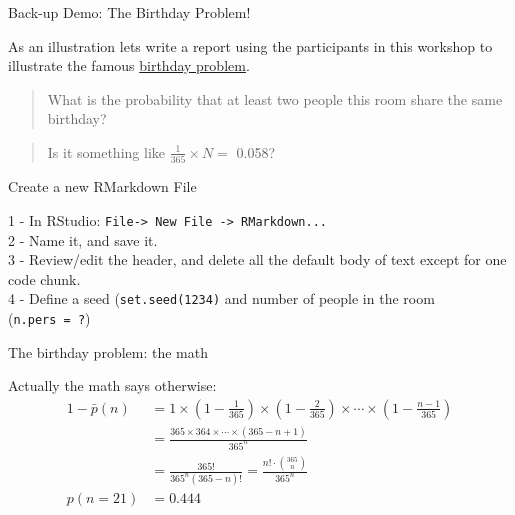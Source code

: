 \documentclass[ignorenonframetext,]{beamer}
\begin{document}
\begin{frame}{Back-up Demo: The Birthday Problem!}
\protect\hypertarget{back-up-demo-the-birthday-problem}{}

As an illustration lets write a report using the participants in this
workshop to illustrate the famous
\href{https://en.wikipedia.org/wiki/Birthday_problem}{birthday problem}.

\begin{quote}
What is the probability that at least two people this room share the
same birthday?
\end{quote}

\begin{quote}
Is it something like \(\frac{1}{365} \times N =\) 0.058?
\end{quote}

\end{frame}

\begin{frame}[fragile]{Create a new RMarkdown File}
\protect\hypertarget{create-a-new-rmarkdown-file}{}

1 - In RStudio:
\texttt{File-\textgreater{}\ New\ File\ -\textgreater{}\ RMarkdown...}\\
2 - Name it, and save it.\\
3 - Review/edit the header, and delete all the default body of text
except for one code chunk.\\
4 - Define a seed (\texttt{set.seed(1234)} and number of people in the
room (\texttt{n.pers\ =\ ?})

\end{frame}

\begin{frame}{The birthday problem: the math}
\protect\hypertarget{the-birthday-problem-the-math}{}

Actually the math says otherwise: \begin{align} 
 1 - \bar p(n) &= 1 \times \left(1-\frac{1}{365}\right) \times \left(1-\frac{2}{365}\right) \times \cdots \times \left(1-\frac{n-1}{365}\right) \nonumber  \\  &= \frac{ 365 \times 364 \times \cdots \times (365-n+1) }{ 365^n } \nonumber \\ &= \frac{ 365! }{ 365^n (365-n)!} = \frac{n!\cdot\binom{365}{n}}{365^n}\\
p(n= 21) &= 0.444  \nonumber
\end{align}

\end{frame}
\end{document}
